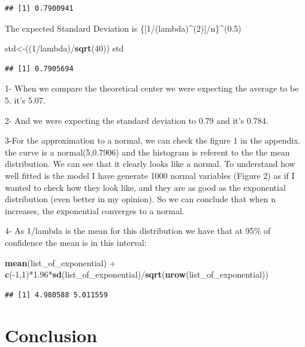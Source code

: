 \documentclass[]{article}
\newenvironment{Shaded}{\begin{snugshade}}{\end{snugshade}}
\newcommand{\KeywordTok}[1]{\textcolor[rgb]{0.13,0.29,0.53}{\textbf{{#1}}}}
\newcommand{\DecValTok}[1]{\textcolor[rgb]{0.00,0.00,0.81}{{#1}}}
\newcommand{\FloatTok}[1]{\textcolor[rgb]{0.00,0.00,0.81}{{#1}}}
\newcommand{\StringTok}[1]{\textcolor[rgb]{0.31,0.60,0.02}{{#1}}}
\newcommand{\NormalTok}[1]{{#1}}
\begin{document}
\begin{verbatim}
## [1] 0.7900941
\end{verbatim}

The expected Standard Deviation is
\{{[}1/(lambda)\^{}(2){]}/n\}\^{}(0.5)

\begin{Shaded}
\begin{Highlighting}[]
\NormalTok{std<-((}\DecValTok{1}\NormalTok{/lambda)/}\KeywordTok{sqrt}\NormalTok{(}\DecValTok{40}\NormalTok{))}
\NormalTok{std}
\end{Highlighting}
\end{Shaded}

\begin{verbatim}
## [1] 0.7905694
\end{verbatim}

1- When we compare the theoretical center we were expecting the average
to be 5. it's 5.07.

2- And we were expecting the standard deviation to 0.79 and it's 0.784.

3-For the approximation to a normal, we can check the figure 1 in the
appendix. the curve is a normal(5,0.7906) and the histogram is referent
to the the mean distribution. We can see that it clearly looks like a
normal. To understand how well fitted is the model I have generate 1000
normal variables (Figure 2) as if I wanted to check how they look like,
and they are as good as the exponential distribution (even better in my
opinion). So we can conclude that when n increases, the exponential
converges to a normal.

4- As 1/lambda is the mean for this distribution we have that at 95\% of
confidence the mean is in this interval:

\begin{Shaded}
\begin{Highlighting}[]
\KeywordTok{mean}\NormalTok{(list_of_exponential) +}\StringTok{ }\KeywordTok{c}\NormalTok{(-}\DecValTok{1}\NormalTok{,}\DecValTok{1}\NormalTok{)*}\FloatTok{1.96}\NormalTok{*}\KeywordTok{sd}\NormalTok{(list_of_exponential)/}\KeywordTok{sqrt}\NormalTok{(}\KeywordTok{nrow}\NormalTok{(list_of_exponential))}
\end{Highlighting}
\end{Shaded}

\begin{verbatim}
## [1] 4.980588 5.011559
\end{verbatim}

\section{Conclusion}\label{conclusion}
\end{document}
